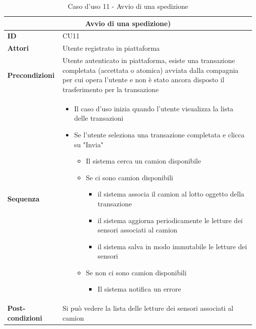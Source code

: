 \documentclass[a4paper,11pt]{article}
\begin{document}
\begin{table}[H]
  \centering
  \begin{tabular}{|m{2cm}|m{10.5cm}|}
    \hline
    \multicolumn{2}{|c|}{\textbf{Avvio di una spedizione)}} \\ \hline
    \multicolumn{1}{|l|}{\textbf{ID}}              & CU11   \\ \hline
    \multicolumn{1}{|l|}{\textbf{Attori}}          &

    Utente registrato in piattaforma

    \\ \hline
    \multicolumn{1}{|l|}{\textbf{Precondizioni}}   &
    Utente autenticato in piattaforma, esiste una transazione completata (accettata o atomica) avviata dalla compagnia per cui opera l'utente e non è stato ancora disposto il trasferimento per la transazione
    \\ \hline
    \multicolumn{1}{|l|}{\textbf{Sequenza}}        &

    \begin{itemize}
      \item Il caso d'uso inizia quando l'utente visualizza la lista delle transazioni
      \item Se l'utente seleziona una transazione completata e clicca su "Invia"
            \begin{itemize}
              \item Il sistema cerca un camion disponibile
              \item Se ci sono camion disponibili
                    \begin{itemize}
                      \item il sistema associa il camion al lotto oggetto della transazione
                      \item il sistema aggiorna periodicamente le letture dei sensori associati al camion
                      \item il sistema salva in modo immutabile le letture dei sensori
                    \end{itemize}
              \item Se non ci sono camion disponibili
                    \begin{itemize}
                      \item Il sistema notifica un errore
                    \end{itemize}
            \end{itemize}
    \end{itemize}

    \\ \hline
    \multicolumn{1}{|l|}{\textbf{Post-condizioni}} &

    Si può vedere la lista delle letture dei sensori associati al camion

    \\ \hline
  \end{tabular}
  \caption{Caso d'uso 11 - Avvio di una spedizione }
  \label{cu:CU11}
\end{table}
\end{document}
